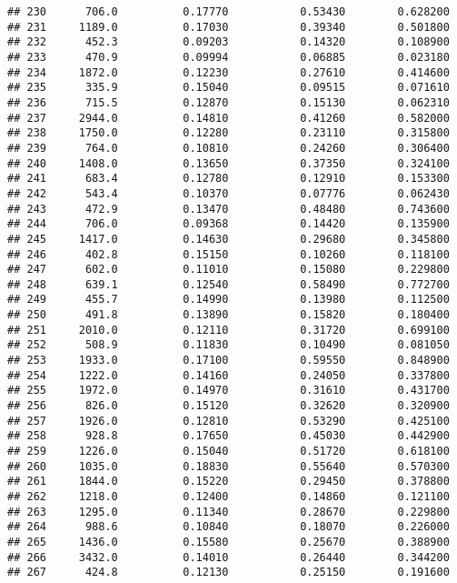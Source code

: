 \documentclass[
]{article}
\begin{document}
\begin{verbatim}
## 230      706.0          0.17770           0.53430        0.628200
## 231     1189.0          0.17030           0.39340        0.501800
## 232      452.3          0.09203           0.14320        0.108900
## 233      470.9          0.09994           0.06885        0.023180
## 234     1872.0          0.12230           0.27610        0.414600
## 235      335.9          0.15040           0.09515        0.071610
## 236      715.5          0.12870           0.15130        0.062310
## 237     2944.0          0.14810           0.41260        0.582000
## 238     1750.0          0.12280           0.23110        0.315800
## 239      764.0          0.10810           0.24260        0.306400
## 240     1408.0          0.13650           0.37350        0.324100
## 241      683.4          0.12780           0.12910        0.153300
## 242      543.4          0.10370           0.07776        0.062430
## 243      472.9          0.13470           0.48480        0.743600
## 244      706.0          0.09368           0.14420        0.135900
## 245     1417.0          0.14630           0.29680        0.345800
## 246      402.8          0.15150           0.10260        0.118100
## 247      602.0          0.11010           0.15080        0.229800
## 248      639.1          0.12540           0.58490        0.772700
## 249      455.7          0.14990           0.13980        0.112500
## 250      491.8          0.13890           0.15820        0.180400
## 251     2010.0          0.12110           0.31720        0.699100
## 252      508.9          0.11830           0.10490        0.081050
## 253     1933.0          0.17100           0.59550        0.848900
## 254     1222.0          0.14160           0.24050        0.337800
## 255     1972.0          0.14970           0.31610        0.431700
## 256      826.0          0.15120           0.32620        0.320900
## 257     1926.0          0.12810           0.53290        0.425100
## 258      928.8          0.17650           0.45030        0.442900
## 259     1226.0          0.15040           0.51720        0.618100
## 260     1035.0          0.18830           0.55640        0.570300
## 261     1844.0          0.15220           0.29450        0.378800
## 262     1218.0          0.12400           0.14860        0.121100
## 263     1295.0          0.11340           0.28670        0.229800
## 264      988.6          0.10840           0.18070        0.226000
## 265     1436.0          0.15580           0.25670        0.388900
## 266     3432.0          0.14010           0.26440        0.344200
## 267      424.8          0.12130           0.25150        0.191600

\end{verbatim}
\end{document}
